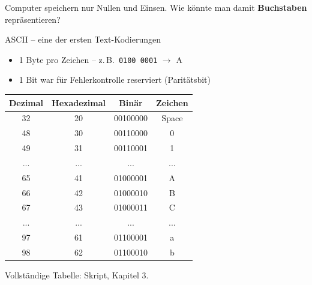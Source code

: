 \renewcommand{\thelektion}{L06 \textperiodcentered{} ASCII \& UTF-8}

\begin{frame}\end{frame}

\begin{frame}
\begin{center}
Computer speichern nur Nullen und Einsen. Wie könnte man damit \textbf{Buchstaben} repräsentieren?
\end{center}
\end{frame}

\begin{frame}
\gls{ASCII} -- eine der ersten Text-Kodierungen
\begin{itemize}[<+->]\setlength\itemsep{6pt}
	\item 1 Byte pro Zeichen -- z.\,B.\ \texttt{0100 0001} $\rightarrow$ A
	\item 1 Bit war für Fehlerkontrolle reserviert (Paritätsbit)
\end{itemize}
\end{frame}

\begin{frame}[fragile]
\begin{table}[H]
	\centering
	\tiny
	\begin{tabular}{cccc}
		\midrule
		Dezimal & Hexadezimal & Binär & Zeichen \\
		\midrule
		32 & 20 & 00100000 & Space \\
		48 & 30 & 00110000 & 0 \\
		49 & 31 & 00110001 & 1 \\\midrule
		... & ... & ... & ... \\\midrule
		65 & 41 & 01000001 & A \\
		66 & 42 & 01000010 & B \\
		67 & 43 & 01000011 & C \\\midrule
		... & ... & ... & ... \\\midrule
		97 & 61 & 01100001 & a \\
		98 & 62 & 01100010 & b \\
		\midrule
	\end{tabular}
\end{table}
\begin{center}Vollständige Tabelle: Skript, Kapitel 3.\end{center}
\end{frame}

